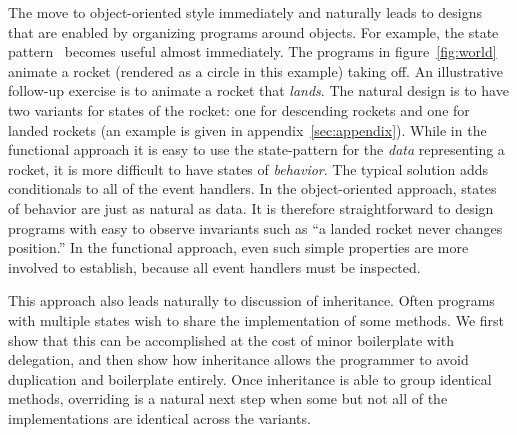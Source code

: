 \documentclass[submission,copyright]{eptcs}
\begin{document}
The move to object-oriented style immediately and naturally leads to
designs that are enabled by organizing programs around objects.  For
example, the state pattern~\cite{samth:GOF} becomes useful almost
immediately.  The programs in figure~\ref{fig:world} animate a rocket
(rendered as a circle in this example) taking off.  An illustrative
follow-up exercise is to animate a rocket that \emph{lands}.  The
natural design is to have two variants for states of the rocket: one
for descending rockets and one for landed rockets (an example is given
in appendix~\ref{sec:appendix}).  While in the functional approach it
is easy to use the state-pattern for the \emph{data} representing a
rocket, it is more difficult to have states of \emph{behavior}.  The
typical solution adds conditionals to all of the event handlers.  In
the object-oriented approach, states of behavior are just as natural
as data.  It is therefore straightforward to design programs with easy
to observe invariants such as ``a landed rocket never changes
position.''  In the functional approach, even such simple properties
are more involved to establish, because all event handlers must be
inspected.

This approach also leads naturally to discussion of inheritance.
Often programs with multiple states wish to share the implementation
of some methods.  We first show that this can be accomplished at the
cost of minor boilerplate with delegation, and then show how
inheritance allows the programmer to avoid duplication and boilerplate
entirely.  Once inheritance is able to group identical methods,
overriding is a natural next step when some but not all of the
implementations are identical across the variants.
\end{document}

